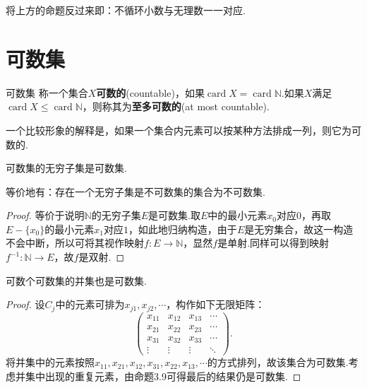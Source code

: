 \documentclass[lang=cn, zihao=5]{elegantbook}
\DeclareMathOperator{\card}{card}
\begin{document}
将上方的命题反过来即：不循环小数与无理数一一对应.

\section{可数集}

\begin{definition}{可数集}
	称一个集合$X$\textbf{可数的}(countable)，如果$\card X = \card \mathbb{N}$.如果$X$满足$\card X \leq \card \mathbb{N}$，则称其为\textbf{至多可数的}(at most countable).
\end{definition}

一个比较形象的解释是，如果一个集合内元素可以按某种方法排成一列，则它为可数的.

\begin{proposition}
	可数集的无穷子集是可数集.
\end{proposition}
\begin{remark}
	等价地有：存在一个无穷子集是不可数集的集合为不可数集.
\end{remark}
\begin{proof}
	等价于说明$\mathbb{N}$的无穷子集$E$是可数集.取$E$中的最小元素$x_0$对应$0$，再取$E-\{ x_0 \}$的最小元素$x_1$对应$1$，如此地归纳构造，由于$E$是无穷集合，故这一构造不会中断，所以可将其视作映射$f:E \to \mathbb{N}$，显然$f$是单射.同样可以得到映射$f^{-1}:\mathbb{N} \to E$，故$f$是双射.
\end{proof}

\begin{proposition}
	可数个可数集的并集也是可数集.
\end{proposition}
\begin{proof}
	设$C_j$中的元素可排为$x_{j1},x_{j2},\cdots $，构作如下无限矩阵：$$\begin{pmatrix}
 x_{11} & x_{12} & x_{13} & \cdots \\
 x_{21} & x_{22} & x_{23} & \cdots \\
 x_{31} & x_{32} & x_{33} & \cdots \\
 \vdots & \vdots & \vdots & \ddots
\end{pmatrix}.$$
	将并集中的元素按照$x_{11},x_{21},x_{12},x_{31},x_{22},x_{13},\cdots$的方式排列，故该集合为可数集.考虑并集中出现的重复元素，由命题3.9可得最后的结果仍是可数集.
\end{proof}
\end{document}
